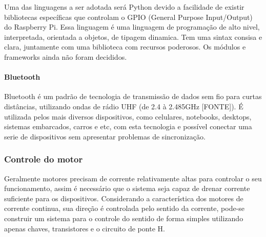   Uma das linguagens a ser adotada será Python devido a facilidade de existir bibliotecas específicas que controlam o GPIO (General Purpose Input/Output) do Raspberry Pi.
  Essa linguagem é uma linguagem de programação de alto nivel, interpretada, orientada a objetos, de tipagem dinamica. Tem uma sintax consisa e clara, juntamente com uma biblioteca com recursos poderosos. Os módulos e frameworks ainda não foram decididos.

\paragraph{Bluetooth}
  Bluetooth é um padrão de tecnologia de transmissão de dados sem fio para curtas distâncias, utilizando ondas de rádio UHF (de 2.4 à 2.485GHz [FONTE]). É utilizada pelos mais diversos dispositivos, como celulares, notebooks, desktops, sistemas embarcados, carros e etc, com esta tecnologia e possível conectar uma serie de dispositivos sem apresentar problemas de sincronização.

\subsubsection{Controle do motor}

  Geralmente motores precisam de corrente relativamente altas para controlar o seu funcionamento, assim é necessário que o sistema seja capaz de drenar corrente suficiente para os dispositivos. Considerando a característica dos motores de corrente continua, sua direção é controlada pelo sentido da corrente, pode-se construir um sistema para o controle do sentido de forma simples utilizando apenas chaves, transistores e o circuito de ponte H. 
